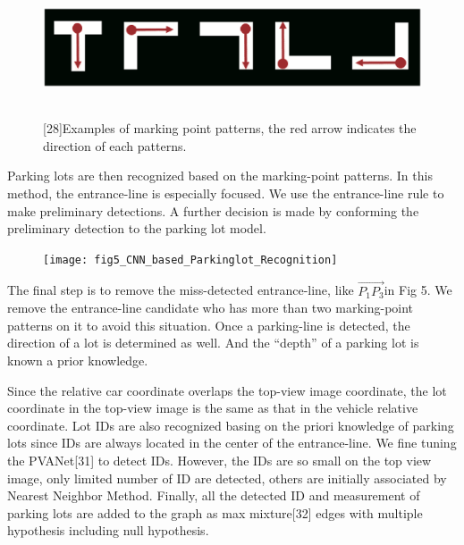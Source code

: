 \documentclass[journal]{IEEEtran}
\begin{document}
\begin{figure}
\centering
\includegraphics[height = 1.6in]{fig4_CNN_based_Parkinglot_Recognition}
\caption{
[28]Examples of marking point patterns, the red arrow indicates the direction of each patterns.
}\label{fig:4}
\end{figure}

Parking lots are then recognized based on the marking-point patterns. In this method, the entrance-line is especially focused. We use the entrance-line rule to make preliminary detections. A further decision is made by conforming the preliminary detection to the parking lot model.

\begin{figure}
\centering
\texttt{[image: fig5\_CNN\_based\_Parkinglot\_Recognition]}
\caption{
}\label{fig:5}
\end{figure}


The final step is to remove the miss-detected entrance-line, like $\overrightarrow{{P}_{1}{P}_{3}}$in Fig 5. We remove the entrance-line candidate who has more than two marking-point patterns on it to avoid this situation.  Once a parking-line is detected, the direction of a lot is determined as well. And the “depth” of a parking lot is known a prior knowledge. 
	
Since the relative car coordinate overlaps the top-view image coordinate, the lot coordinate in the top-view image is the same as that in the vehicle relative coordinate. Lot IDs are also recognized basing on the priori knowledge of parking lots since IDs are always located in the center of the entrance-line. We fine tuning the PVANet[31] to detect IDs. However, the IDs are so small on the top view image, only limited number of ID are detected, others are initially associated by Nearest Neighbor Method. Finally, all the detected ID and measurement of parking lots are added to the graph as max mixture[32] edges with multiple hypothesis including null hypothesis.
\end{document}
